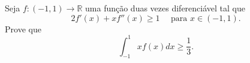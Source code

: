 Seja \(f\colon (-1,1)\to \mathbb{R}\) uma função duas vezes diferenciável tal que
\[2f'(x)+xf''(x)\geqslant 1 \quad \text{ para } x\in (-1,1).\] Prove que
\[\int_{-1}^{1}xf(x)dx\geqslant \frac{1}{3}.\]
